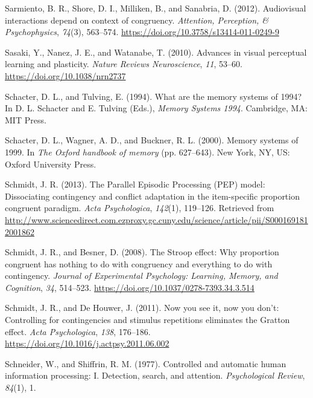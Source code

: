 \documentclass[]{DissertateCUNY}
\begin{document}
\leavevmode\hypertarget{ref-sarmiento_audiovisual_2012}{}%
Sarmiento, B. R., Shore, D. I., Milliken, B., and Sanabria, D. (2012).
Audiovisual interactions depend on context of congruency.
\emph{Attention, Perception, \& Psychophysics}, \emph{74}(3), 563--574.
\url{https://doi.org/10.3758/s13414-011-0249-9}

\leavevmode\hypertarget{ref-sasaki_advances_2010}{}%
Sasaki, Y., Nanez, J. E., and Watanabe, T. (2010). Advances in visual
perceptual learning and plasticity. \emph{Nature Reviews Neuroscience},
\emph{11}, 53--60. \url{https://doi.org/10.1038/nrn2737}

\leavevmode\hypertarget{ref-schacter_what_1994}{}%
Schacter, D. L., and Tulving, E. (1994). What are the memory systems of
1994? In D. L. Schacter and E. Tulving (Eds.), \emph{Memory Systems
1994}. Cambridge, MA: MIT Press.

\leavevmode\hypertarget{ref-schacter_memory_2000}{}%
Schacter, D. L., Wagner, A. D., and Buckner, R. L. (2000). Memory
systems of 1999. In \emph{The Oxford handbook of memory} (pp. 627--643).
New York, NY, US: Oxford University Press.

\leavevmode\hypertarget{ref-schmidt_parallel_2013}{}%
Schmidt, J. R. (2013). The Parallel Episodic Processing (PEP) model:
Dissociating contingency and conflict adaptation in the item-specific
proportion congruent paradigm. \emph{Acta Psychologica}, \emph{142}(1),
119--126. Retrieved from
\url{http://www.sciencedirect.com.ezproxy.gc.cuny.edu/science/article/pii/S0001691812001862}

\leavevmode\hypertarget{ref-schmidt_stroop_2008}{}%
Schmidt, J. R., and Besner, D. (2008). The Stroop effect: Why proportion
congruent has nothing to do with congruency and everything to do with
contingency. \emph{Journal of Experimental Psychology: Learning, Memory,
and Cognition}, \emph{34}, 514--523.
\url{https://doi.org/10.1037/0278-7393.34.3.514}

\leavevmode\hypertarget{ref-schmidt_now_2011}{}%
Schmidt, J. R., and De Houwer, J. (2011). Now you see it, now you don't:
Controlling for contingencies and stimulus repetitions eliminates the
Gratton effect. \emph{Acta Psychologica}, \emph{138}, 176--186.
\url{https://doi.org/10.1016/j.actpsy.2011.06.002}

\leavevmode\hypertarget{ref-schneider_controlled_1977}{}%
Schneider, W., and Shiffrin, R. M. (1977). Controlled and automatic
human information processing: I. Detection, search, and attention.
\emph{Psychological Review}, \emph{84}(1), 1.
\end{document}
